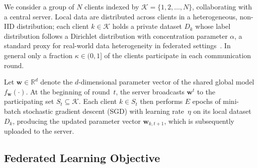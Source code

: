 \documentclass[journal]{IEEEtran}
\begin{document}
We consider a group of $N$ clients indexed by $\mathcal{K} = \{1, 2, \ldots, N\}$, collaborating with a central server. Local data are distributed across clients in a heterogeneous, non-IID distribution; each client $k \in \mathcal{K}$ holds a private dataset $D_k$ whose label distribution follows a Dirichlet distribution with concentration parameter $\alpha$, a standard proxy for real-world data heterogeneity in federated settings~\cite{hsieh2020non}. In general only a fraction $\kappa \in (0, 1]$ of the clients participate in each communication round.

Let $\mathbf{w} \in \mathbb{R}^d$ denote the $d$-dimensional parameter vector of the shared global model $f_{\mathbf{w}}(\cdot)$. At the beginning of round~$t$, the server broadcasts $\mathbf{w}^t$ to the participating set $S_t \subseteq \mathcal{K}$. Each client $k \in S_t$ then performs $E$ epochs of mini-batch stochastic gradient descent (SGD) with learning rate~$\eta$ on its local dataset $D_k$, producing the updated parameter vector $\mathbf{w}_{k,t+1}$, which is subsequently uploaded to the server.

\subsection{Federated Learning Objective}
\end{document}
